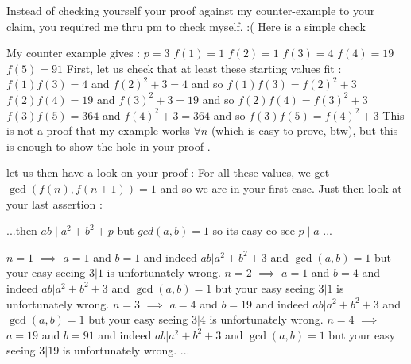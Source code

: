 \begin{solution}
	Instead of checking yourself your proof against my counter-example to your claim, you required me thru pm to check myself. :(
Here is a simple check

My counter example gives :
$p=3$
$f(1)=1$
$f(2)=1$
$f(3)=4$
$f(4)=19$
$f(5)=91$
First, let us check that at least these starting values fit :
$f(1)f(3)=4$ and $f(2)^2+3=4$ and so $f(1)f(3)=f(2)^2+3$
$f(2)f(4)=19$ and $f(3)^2+3=19$ and so $f(2)f(4)=f(3)^2+3$
$f(3)f(5)=364$ and $f(4)^2+3=364$ and so $f(3)f(5)=f(4)^2+3$
This is not a proof that my example works $\forall n$ (which is easy to prove, btw), but this is enough to show the hole in your proof .

let us then have a look on your proof :
For all these values, we get $\gcd(f(n),f(n+1))=1$ and so we are in your first case.
Just then look at your last assertion :

\begin{tcolorbox}...then $ab\mid a^2+b^2+p$ but $gcd(a,b)=1$ so its easy eo see $p\mid a$ ...\end{tcolorbox}
$n=1$ $\implies$ $a=1$ and $b=1$ and indeed $ab|a^2+b^2+3$ and $\gcd(a,b)=1$ but your easy seeing $3|1$ is unfortunately wrong.
$n=2$ $\implies$ $a=1$ and $b=4$ and indeed $ab|a^2+b^2+3$ and $\gcd(a,b)=1$ but your easy seeing $3|1$ is unfortunately wrong.
$n=3$ $\implies$ $a=4$ and $b=19$ and indeed $ab|a^2+b^2+3$ and $\gcd(a,b)=1$ but your easy seeing $3|4$ is unfortunately wrong.
$n=4$ $\implies$ $a=19$ and $b=91$ and indeed $ab|a^2+b^2+3$ and $\gcd(a,b)=1$ but your easy seeing $3|19$ is unfortunately wrong.
...
\end{solution}



